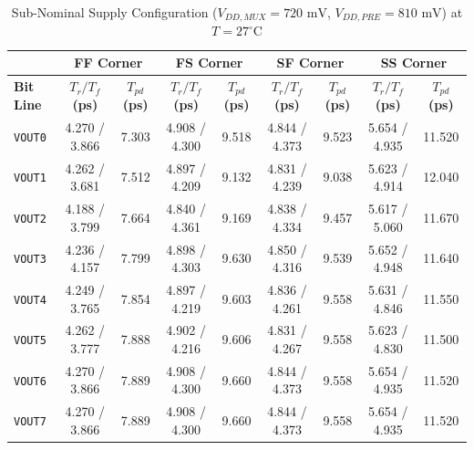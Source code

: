 \begin{table}[H]
    \centering
    \renewcommand{\arraystretch}{1.3}
    \setlength{\tabcolsep}{4pt}
    \small
    \begin{tabular}{|l|cc|cc|cc|cc|}
        \hline
        & \multicolumn{2}{c|}{\textbf{FF Corner}} & \multicolumn{2}{c|}{\textbf{FS Corner}} & \multicolumn{2}{c|}{\textbf{SF Corner}} & \multicolumn{2}{c|}{\textbf{SS Corner}} \\ \hline
        \textbf{Bit Line} & \textbf{$T_r / T_f$ (ps)} & \textbf{$T_{pd}$ (ps)} & \textbf{$T_r / T_f$ (ps)} & \textbf{$T_{pd}$ (ps)} & \textbf{$T_r / T_f$ (ps)} & \textbf{$T_{pd}$ (ps)} & \textbf{$T_r / T_f$ (ps)} & \textbf{$T_{pd}$ (ps)} \\ \hline
        \texttt{VOUT0} & 4.270 / 3.866 & 7.303 & 4.908 / 4.300 & 9.518 & 4.844 / 4.373 & 9.523 & 5.654 / 4.935 & 11.520 \\ 
        \texttt{VOUT1} & 4.262 / 3.681 & 7.512 & 4.897 / 4.209 & 9.132 & 4.831 / 4.239 & 9.038 & 5.623 / 4.914 & 12.040 \\ 
        \texttt{VOUT2} & 4.188 / 3.799 & 7.664 & 4.840 / 4.361 & 9.169 & 4.838 / 4.334 & 9.457 & 5.617 / 5.060 & 11.670 \\ 
        \texttt{VOUT3} & 4.236 / 4.157 & 7.799 & 4.898 / 4.303 & 9.630 & 4.850 / 4.316 & 9.539 & 5.652 / 4.948 & 11.640 \\ 
        \texttt{VOUT4} & 4.249 / 3.765 & 7.854 & 4.897 / 4.219 & 9.603 & 4.836 / 4.261 & 9.558 & 5.631 / 4.846 & 11.550 \\ 
        \texttt{VOUT5} & 4.262 / 3.777 & 7.888 & 4.902 / 4.216 & 9.606 & 4.831 / 4.267 & 9.558 & 5.623 / 4.830 & 11.500 \\ 
        \texttt{VOUT6} & 4.270 / 3.866 & 7.889 & 4.908 / 4.300 & 9.660 & 4.844 / 4.373 & 9.558 & 5.654 / 4.935 & 11.520 \\ 
        \texttt{VOUT7} & 4.270 / 3.866 & 7.889 & 4.908 / 4.300 & 9.660 & 4.844 / 4.373 & 9.558 & 5.654 / 4.935 & 11.520 \\ \hline
    \end{tabular}
    \vspace{2mm}
    \caption{Sub-Nominal Supply Configuration ($V_{DD,MUX} = 720\text{ mV}$, $V_{DD,PRE} = 810\text{ mV}$) at $T = 27^{\circ}\text{C}$}
    \label{tab:subnominal_sym_27}
\end{table}

